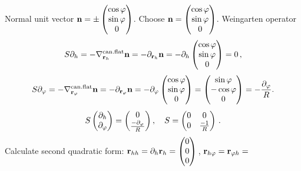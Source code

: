 \documentclass[12pt]{article}
\theoremstyle{theorem}
\numberwithin{equation}{section}
\begin{document}
   Normal unit vector ${\bf n}=\pm \begin{pmatrix}
        \cos \varphi\cr
        \sin\varphi\cr
        0\cr
   \end{pmatrix}$. Choose ${\bf n}=\begin{pmatrix}
        \cos \varphi\cr
        \sin\varphi\cr
        0\cr
   \end{pmatrix}$. Weingarten operator
     \begin{equation*}\label{weingrartenforcylinder}
        S\partial_h=-\nabla^{\rm can.flat}_{{\bf r}_h}{\bf n}=-\partial_{{\bf r}_h} {\bf n}=-\partial_h\begin{pmatrix}
        \cos \varphi\cr
        \sin\varphi\cr
        0\cr
   \end{pmatrix}=0\,,
     \end{equation*}
\begin{equation*}\label{weingrartenforcylinder}
        S\partial_\varphi=-\nabla^{\rm can.flat}_{{\bf r}_\varphi}{\bf n}=-\partial_{{\bf r}_\varphi} {\bf n}=-{\partial_\varphi}
        \begin{pmatrix}
        \cos \varphi\cr
        \sin\varphi\cr
        0\cr
   \end{pmatrix}=\begin{pmatrix}
        \sin\varphi \cr
        -\cos\varphi\cr
        0\cr
   \end{pmatrix}=-{\partial_\varphi\over R}.
    \end{equation*}
\begin{equation}\label{weingrartenforcylinder2}
           S
   \begin{pmatrix}
        \partial_h \cr
        \partial_\varphi\cr
   \end{pmatrix}=
   \begin{pmatrix}
         0\cr
        {-\partial_\varphi\over R}\cr
   \end{pmatrix},\quad S=\begin{pmatrix}0&0\cr 0 &{-1\over R}\end{pmatrix}\,.
    \end{equation}
Calculate   second quadratic form:  ${\bf r}_{hh}=\partial_h{\bf r}_h=
  \begin{pmatrix}
        0\\
        0\\
        0\\
   \end{pmatrix}\,$, ${\bf r}_{h\varphi}={\bf r}_{\varphi h}=$
\end{document}
